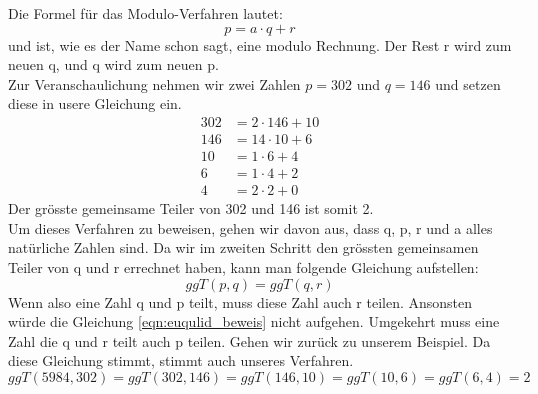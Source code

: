 Die Formel für das Modulo-Verfahren lautet:
%
\begin{equation}
  \label{eqn:euklidischer_algo}
  p = a \cdot q + r
\end{equation}
%
und ist, wie es der Name schon sagt, eine modulo Rechnung. Der Rest r wird zum neuen q, und q wird zum neuen p. \\
Zur Veranschaulichung nehmen wir zwei Zahlen $p = 302$ und $q = 146$ und setzen diese in usere Gleichung ein.
%
\begin{equation}
  \begin{split}
    302 & = 2 \cdot 146 + 10 \\
    146 & = 14 \cdot 10 + 6  \\
    10 & = 1 \cdot 6 + 4  \\
    6 & = 1 \cdot 4 + 2  \\
    4 & = 2 \cdot 2 + 0
    \label{eqn:euqulid_beweis}
  \end{split}
\end{equation}
%
Der grösste gemeinsame Teiler von 302 und 146 ist somit 2. \\[2ex]
Um dieses Verfahren zu beweisen, gehen wir davon aus, dass q, p, r und a alles natürliche Zahlen sind. Da wir im zweiten Schritt den grössten gemeinsamen Teiler von q und r errechnet haben, kann man folgende Gleichung aufstellen:
%
\begin{equation}
  ggT(p,q) = ggT(q,r)
  \label{eqn:ggT}
\end{equation}
%
Wenn also eine Zahl q und p teilt, muss diese Zahl auch r teilen. Ansonsten würde die Gleichung \ref{eqn:euqulid_beweis} nicht aufgehen. Umgekehrt muss eine Zahl die q und r teilt auch p teilen. 
Gehen wir zurück zu unserem Beispiel. Da diese Gleichung stimmt, stimmt auch unseres Verfahren.
%
\begin{equation*}
 ggT(5984,302) = ggT(302,146) = ggT(146,10) = ggT(10,6) = ggT(6,4) = 2 
\end{equation*}
%
